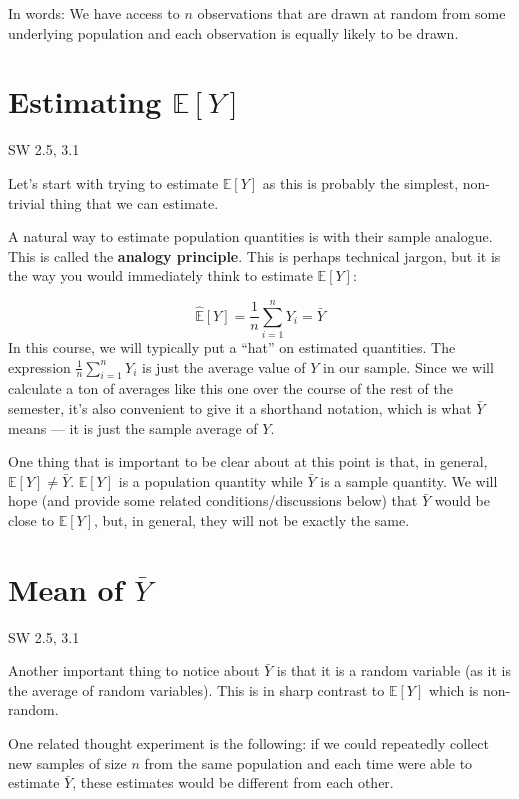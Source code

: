 \documentclass[
  letterpaper,
  DIV=11,
  numbers=noendperiod]{scrreprt}
\begin{document}
In words: We have access to \(n\) observations that are drawn at random
from some underlying population and each observation is equally likely
to be drawn.

\section{\texorpdfstring{Estimating
\(\mathbb{E}[Y]\)}{Estimating \textbackslash mathbb\{E\}{[}Y{]}}}\label{estimating-mathbbey}

SW 2.5, 3.1

Let's start with trying to estimate \(\mathbb{E}[Y]\) as this is
probably the simplest, non-trivial thing that we can estimate.

A natural way to estimate population quantities is with their sample
analogue. This is called the \textbf{analogy principle}. This is perhaps
technical jargon, but it is the way you would immediately think to
estimate \(\mathbb{E}[Y]\):

\[
  \hat{\mathbb{E}}[Y] = \frac{1}{n} \sum_{i=1}^n Y_i = \bar{Y}
\] In this course, we will typically put a ``hat'' on estimated
quantities. The expression \(\displaystyle \frac{1}{n}\sum_{i=1}^n Y_i\)
is just the average value of \(Y\) in our sample. Since we will
calculate a ton of averages like this one over the course of the rest of
the semester, it's also convenient to give it a shorthand notation,
which is what \(\bar{Y}\) means --- it is just the sample average of
\(Y\).

One thing that is important to be clear about at this point is that, in
general, \(\mathbb{E}[Y] \neq \bar{Y}\). \(\mathbb{E}[Y]\) is a
population quantity while \(\bar{Y}\) is a sample quantity. We will hope
(and provide some related conditions/discussions below) that \(\bar{Y}\)
would be close to \(\mathbb{E}[Y]\), but, in general, they will not be
exactly the same.

\section{\texorpdfstring{Mean of
\(\bar{Y}\)}{Mean of \textbackslash bar\{Y\}}}\label{mean-of-bary}

SW 2.5, 3.1

Another important thing to notice about \(\bar{Y}\) is that it is a
random variable (as it is the average of random variables). This is in
sharp contrast to \(\mathbb{E}[Y]\) which is non-random.

One related thought experiment is the following: if we could repeatedly
collect new samples of size \(n\) from the same population and each time
were able to estimate \(\bar{Y}\), these estimates would be different
from each other.
\end{document}
